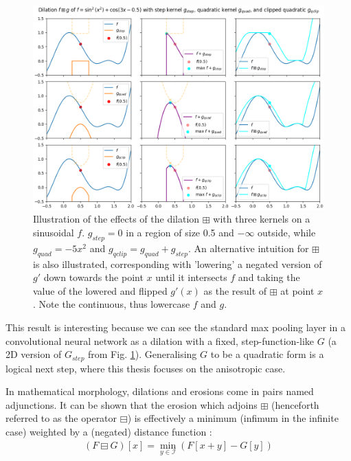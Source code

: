 \documentclass[a4paper, 12pt]{report}
\begin{document}
\begin{figure}[h!]
  \includegraphics[width=\textwidth]{figures/dilation_illustration.png}
  \caption{Illustration of the effects of the dilation $\boxplus$ with three kernels on a sinusoidal $f$. $g_{step}=0$ in a region of size 0.5 and $-\infty$ outside, while $g_{quad}=-5x^2$ and $g_{qclip}=g_{quad}+g_{step}$. An alternative intuition for $\boxplus$ is also illustrated, corresponding with 'lowering' a negated version of $g'$ down towards the point $x$ until it intersects $f$ and taking the value of the lowered and flipped $g'(x)$ as the result of $\boxplus$ at point $x$. Note the continuous, thus lowercase $f$ and $g$.}
  \label{fig:dil-illust}
\end{figure}

This result is interesting because we can see the standard max pooling layer in a convolutional neural network as a dilation with a fixed, step-function-like $G$ (a 2D version of $G_{step}$ from Fig. \ref{fig:dil-illust}). Generalising $G$ to be a quadratic form is a logical next step, where this thesis focuses on the anisotropic case.

In mathematical morphology, dilations and erosions come in pairs named adjunctions. It can be shown that the erosion which adjoins $\boxplus$ (henceforth referred to as the operator $\boxminus$) is effectively a minimum (infimum in the infinite case) weighted by a (negated) distance function \cite{heijmans1996morphological}: 
\begin{align}
	(F \boxminus G)[x]=\min_{y\in \mathcal{I}}(F[x+y] - G[y])
\end{align}
\end{document}
